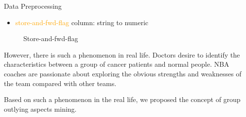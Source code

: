 \documentclass[
 size=14pt,
 paper=smartboard,  %
 mode=present, 		%
 display=slides, 	%
 style=tuliplab,  	%
 pauseslide,
 fleqn,leqno]{powerdot}
\begin{document}
\begin{slide}[toc=,bm=]{Data Preprocessing}

\begin{itemize}
\item
\textcolor{orange}{store-and-fwd-flag} column: string to numeric
\end{itemize}

\centering
\begin{figure}[htbp]
    \centering
    \caption{Store-and-fwd-flag}
    \label{fig:fre-dis-each-feature}
\end{figure}
\centering



\begin{note}
However,
there is such a phenomenon in real life.
Doctors desire to identify the characteristics between
a group of cancer patients and normal people.
NBA coaches are passionate about exploring the obvious strengths and
weaknesses of the team compared with other teams.

Based on such a phenomenon in the real life,
we proposed the concept of group outlying aspects mining.
\end{note}

\end{slide}
\end{document}
